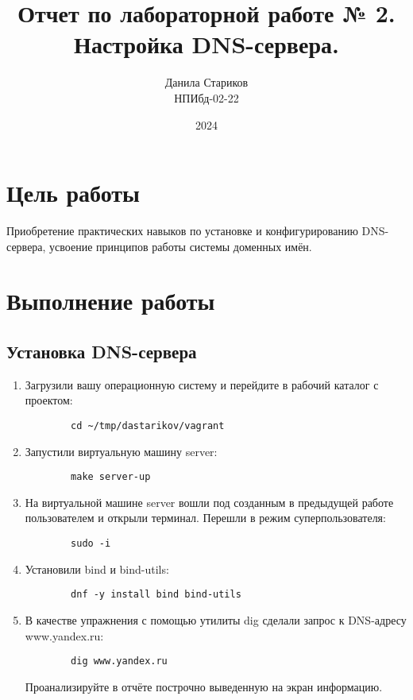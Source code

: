 

\title{Отчет по лабораторной работе № 2. \\ Настройка DNS-сервера.}
\author{Данила Стариков \\ НПИбд-02-22}
\date{2024}



\maketitle
\newpage

\tableofcontents

\newpage
\section{Цель работы}
Приобретение практических навыков по установке и конфигурированию DNS- сервера, усвоение принципов работы системы доменных имён.

\newpage
\section{Выполнение работы}
\subsection{Установка DNS-сервера}
\begin{enumerate}
    \item Загрузили вашу операционную систему и перейдите в рабочий каталог с проектом:
        \begin{verbatim}
        cd ~/tmp/dastarikov/vagrant
        \end{verbatim}
    \item Запустили виртуальную машину server:
        \begin{verbatim}
        make server-up
        \end{verbatim}
    \item На виртуальной машине server вошли под созданным  в предыдущей работе пользователем и открыли терминал. Перешли в режим суперпользователя:
        \begin{verbatim}
        sudo -i
        \end{verbatim}
    \item Установили bind и bind-utils:
        \begin{verbatim}
        dnf -y install bind bind-utils
        \end{verbatim}
    \item В качестве упражнения с помощью утилиты dig сделали запрос к DNS-адресу www.yandex.ru:
        \begin{verbatim}
        dig www.yandex.ru
        \end{verbatim}
Проанализируйте в отчёте построчно выведенную на экран информацию.
\end{enumerate}

